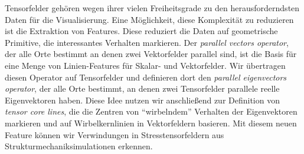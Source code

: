\documentclass[oneside]{scrartcl}
\begin{document}
%
Tensorfelder geh\"oren wegen ihrer vielen Freiheitsgrade zu den
herausforderndsten Daten f\"ur die Visualisierung.
%
Eine M\"oglichkeit, diese Komplexit\"at zu reduzieren ist die Extraktion von
Features.
%
Diese reduziert die Daten auf geometrische Primitive, die interessantes
Verhalten markieren.
%
Der \emph{parallel vectors operator}, der alle Orte bestimmt an denen zwei
Vektorfelder parallel sind, ist die Basis f\"ur eine Menge von Linien-Features
f\"ur Skalar- und Vektorfelder.
%
Wir übertragen diesen Operator auf Tensorfelder und definieren dort den
\emph{parallel eigenvectors operator}, der alle Orte bestimmt, an denen zwei
Tensorfelder parallele reelle Eigenvektoren haben.
%
Diese Idee nutzen wir anschlie\ss{}end zur Definition von \emph{tensor core
lines}, die die Zentren von ``wirbelndem'' Verhalten der Eigenvektoren markieren
und auf Wirbelkernlinien in Vektorfeldern basieren.
%
Mit diesem neuen Feature k\"onnen wir Verwindungen in Stresstensorfeldern aus
Strukturmechaniksimulationen erkennen.
%
\clearpage
%
%
\end{document}
